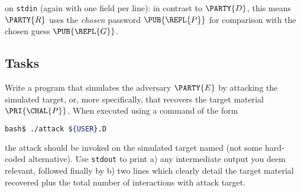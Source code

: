 \documentclass[crop={false},multi={true},tikz={true}]{standalone}
\begin{document}
\noindent
on \lstinline[language={bash}]{stdin} (again with one field per line):
in contrast to $\PARTY{D}$, this means $\PARTY{R}$ uses the
{\em chosen} password $\PUB{\REPL{P}}$
for comparison with the
     chosen  guess    $\PUB{\REPL{G}}$.

\subsection{Tasks}

      Write a program that simulates the adversary $\PARTY{E}$ by attacking
      the simulated target, or, more specifically, that recovers the target 
      material $\PRI{\CHAL{P}}$.  
      When executed using a command of the form

      \begin{lstlisting}[language={bash},gobble={6}]
      bash$ ./attack ${USER}.D
      \end{lstlisting}

      \noindent
      the attack should be invoked on the simulated target named (not some
      hard-coded alternative).  Use \lstinline[language={bash}]{stdout} to 
      print 
      a) any intermediate output you deem relevant, followed finally by 
      b) two lines which clearly detail the target material recovered plus
         the total number of interactions with attack target.


\ifstandalone
\printbibliography
\fi
\end{document}
